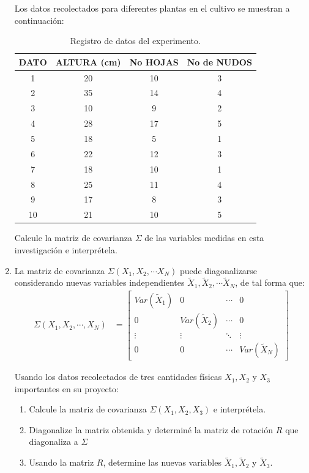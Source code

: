 \documentclass{article}
\begin{document}
\begin{enumerate}
Los datos recolectados para diferentes plantas en el cultivo se muestran a continuación:

\begin{table}[H]
\centering
\begin{tabular}{c|c|c|c}
\hline
\textbf{DATO} & \textbf{ALTURA (cm)} & \textbf{No HOJAS} & \textbf{No de NUDOS}\\
\hline
1 & 20 & 10 & 3\\
2 & 35 & 14 & 4\\
3 & 10 & 9 & 2\\
4 & 28 & 17 & 5\\
5 & 18 & 5 & 1\\
6 & 22 & 12 & 3\\
7 & 18 & 10 & 1\\
8 & 25 & 11 & 4\\
9 & 17 & 8 & 3\\
10 & 21 & 10 & 5\\
\hline
\end{tabular}
\caption{Registro de datos del experimento.}
\label{datos_planta}
\end{table}

Calcule la matriz de covarianza $\Sigma$ de las variables medidas en esta investigación e interprétela.


\item La matriz de covarianza $\Sigma (X_{1},X_{2},\cdots X_{N})$ puede diagonalizarse considerando nuevas variables independientes $\tilde{X}_{1},\tilde{X}_{2},\cdots \tilde{X}_{N}$, de tal forma que:
\begin{align*}
\Sigma(X_{1},X_{2},\cdots, X_{N})&=\left[\begin{matrix}
Var(\tilde{X}_{1}) & 0 & \cdots & 0\\
0 & Var(\tilde{X}_{2}) & \cdots & 0\\
\vdots & \vdots & \ddots & \vdots \\
0 & 0& \cdots & Var(\tilde{X}_{N})
\end{matrix}\right]
\end{align*}


Usando los datos recolectados de tres cantidades físicas $X_{1},X_{2}$ y $X_{3}$ importantes en su proyecto:


\begin{enumerate}
\item Calcule la matriz de covarianza $\Sigma (X_{1},X_{2},X_{3})$ e interprétela.
\item Diagonalize la matriz obtenida y determiné la matriz de rotación $R$ que diagonaliza a $\Sigma$
\item Usando la matriz $R$, determine las nuevas variables $\tilde{X}_{1},\tilde{X}_{2}$ y $\tilde{X}_{3}$.
\end{enumerate}


\end{enumerate}
\end{document}

